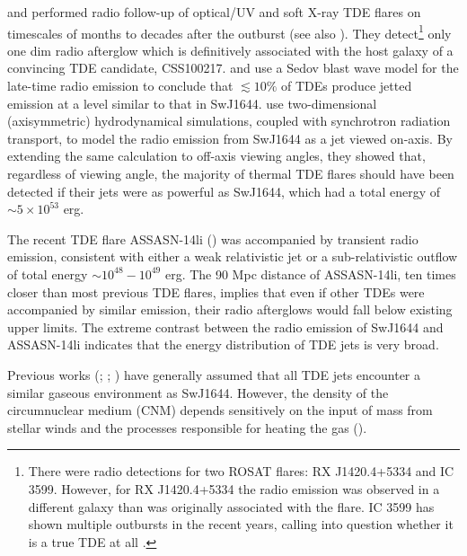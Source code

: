 \documentclass[usenatbib,fleqn]{mnras}
\begin{document}
\citet{Bower+2013} and \citet{van-Velzen+2013} performed radio
follow-up of optical/UV and soft X-ray TDE flares on timescales of
months to decades after the outburst (see also
\citealt{Arcavi+2014}). They detect\footnote{There were radio
  detections for two ROSAT flares: RX J1420.4+5334 and IC
  3599. However, for RX J1420.4+5334 the radio emission was observed
  in a different galaxy than was originally associated with the flare.
  IC 3599 has shown multiple outbursts in the recent years, calling
  into question whether it is a true TDE at all \citep{Campana+2015}.}
only one dim radio afterglow which is definitively associated with the
host galaxy of a convincing TDE candidate, CSS100217.
\citet{Bower+2013} and \citet{van-Velzen+2013} use a Sedov blast wave
model for the late-time radio emission to conclude that $\lesssim
10\%$ of TDEs produce jetted emission at a level similar to that in
SwJ1644.  \citet{Mimica+2015} use two-dimensional (axisymmetric)
hydrodynamical simulations, coupled with synchrotron radiation
transport, to model the radio emission from SwJ1644 as a jet viewed
on-axis.  By extending the same calculation to off-axis viewing
angles, they showed that, regardless of viewing angle, the majority of
thermal TDE flares should have been detected if their jets were as
powerful as SwJ1644, which had a total energy of $\sim 5\times
10^{53}$ erg.


The recent TDE flare ASSASN-14li (\citealt{Holoien+2016a}) was
accompanied by transient radio emission, consistent with either a weak
relativistic jet \citep{van-Velzen+2015} or a sub-relativistic outflow
\citep{Alexander+2015,Krolik+16} of total energy $\sim
10^{48}-10^{49}$ erg.  The 90 Mpc distance of ASSASN-14li, ten
times closer than most previous TDE flares, implies that even if other
TDEs were accompanied by similar emission, their radio afterglows
would fall below existing upper limits.  The extreme contrast between
the radio emission of SwJ1644 and ASSASN-14li indicates that the
energy distribution of TDE jets is very broad.

Previous works (\citealt{Bower+2013}; \citealt{van-Velzen+2013};
\citealt{Mimica+2015}) have generally assumed that all TDE jets
encounter a similar gaseous environment as SwJ1644.  However, the
density of the circumnuclear medium (CNM) depends sensitively on the
input of mass from stellar winds and the processes responsible for
heating the gas (\citealt{Quataert2004,Generozov+2015}). 
\end{document}
